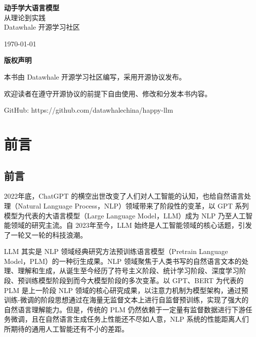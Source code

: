 \documentclass[12pt,a4paper]{book}
\begin{document}
\begin{titlepage}
    \centering
    \vspace*{2cm}
    
    {\Huge\bfseries 动手学大语言模型}\\[2cm]
    
    {\Large 从理论到实践}\\[1cm]
    
    {\large Datawhale 开源学习社区}\\[2cm]
    
    \vfill
    
    {\large \today}
\end{titlepage}

\newpage
\thispagestyle{empty}
\vspace*{2cm}
\begin{center}
    \textbf{版权声明}
    
    \vspace{1cm}
    
    本书由 Datawhale 开源学习社区编写，采用开源协议发布。
    
    欢迎读者在遵守开源协议的前提下自由使用、修改和分发本书内容。
    
    \vspace{1cm}
    
    GitHub: https://github.com/datawhalechina/happy-llm
\end{center}

\tableofcontents
\newpage

\chapter{前言}
{
\setcounter{tocdepth}{3}
\tableofcontents
}
\section{前言}\label{ux524dux8a00}

2022年底，ChatGPT
的横空出世改变了人们对人工智能的认知，也给自然语言处理（Natural Language
Process，NLP）领域带来了阶段性的变革，以 GPT
系列模型为代表的大语言模型（Large Language Model，LLM）成为 NLP
乃至人工智能领域的研究主流。自 2023年至今，LLM
始终是人工智能领域的核心话题，引发了一轮又一轮的科技浪潮。

LLM 其实是 NLP 领域经典研究方法预训练语言模型（Pretrain Language
Model，PLM）的一种衍生成果。NLP
领域聚焦于人类书写的自然语言文本的处理、理解和生成，从诞生至今经历了符号主义阶段、统计学习阶段、深度学习阶段、预训练模型阶段到而今大模型阶段的多次变革。以
GPT、BERT 为代表的 PLM 是上一阶段 NLP
领域的核心研究成果，以注意力机制为模型架构，通过预训练-微调的阶段思想通过在海量无监督文本上进行自监督预训练，实现了强大的自然语言理解能力。但是，传统的
PLM
仍然依赖于一定量有监督数据进行下游任务微调，且在自然语言生成任务上性能还不尽如人意，NLP
系统的性能距离人们所期待的通用人工智能还有不小的差距。
\end{document}
